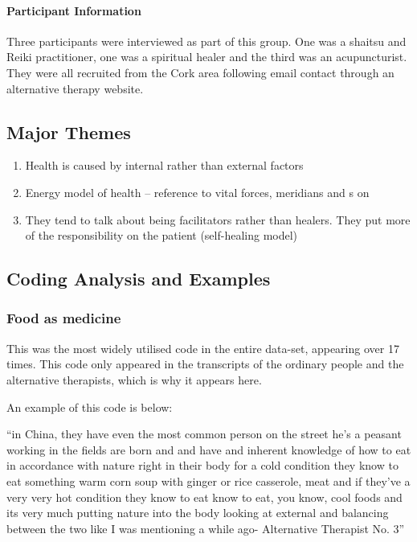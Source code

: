 \paragraph{Participant Information}

Three participants were interviewed as part of this group. One was a shaitsu and Reiki practitioner, one was a spiritual healer and the third was an acupuncturist. They were all recruited from the Cork area following email contact through an alternative therapy website. 

\subsection{Major Themes}
\begin{enumerate}
\item Health is caused by internal rather than external factors
\item Energy model of health – reference to vital forces, meridians and s on
\item They tend to talk about being facilitators rather than healers. They put more of the responsibility on the patient (self-healing model)
\end{enumerate}

\subsection{Coding Analysis and Examples}

\subsubsection{Food as medicine}

This was the most widely utilised code in the entire data-set, appearing over 17 times. This code only appeared in the transcripts of the ordinary people and the alternative therapists, which is why it appears here. 

An example of this code is below:

``in China, they have even the most common person on the street he's a peasant working in the fields are born and and have and inherent knowledge of how to eat in accordance with nature right in their body for a cold condition they know to eat something warm corn soup with ginger or rice casserole, meat and if they've a very very hot condition they know to eat know to eat, you know, cool foods and its very much putting nature into the body looking at external and balancing between the two like I was mentioning a while ago- Alternative Therapist No. 3''

